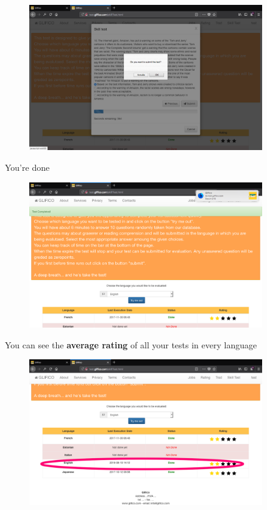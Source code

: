 \documentclass[11 pt, a4paper]{article}
\begin{document}
\begin{figure}[H]
\centering
\includegraphics[width=0.9\textwidth]{translator_skilltest7.png}
\end{figure}


\clearpage
You're done
\begin{figure}[H]
\centering
\includegraphics[width=0.9\textwidth]{translator_skilltest8.png}
\end{figure}

You can see the \textbf{average rating} of all your tests in every language
\begin{figure}[H]
\centering
\includegraphics[width=0.9\textwidth]{translator_skilltest9.png}
\end{figure}
\end{document}
